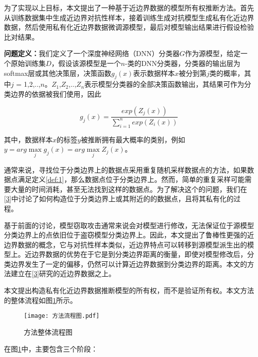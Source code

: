 为了实现以上目标，本文提出了一种基于近边界数据的模型所有权推断方法。首先从训练数据集中生成近边界对抗性样本，接着训练生成对抗模型生成私有化近边界数据，然后使用私有化近边界数据微调源模型，最后对模型输出结果进行假设检验比对结果。

\noindent\textbf{问题定义：}我们定义了一个深度神经网络（DNN）分类器$G$作为源模型，给定一个原始训练集$D$，假设该源模型是一个$n$-类的DNN分类器，分类器的输出层为softmax层或其他决策层，决策函数$g_j(x)$表示数据样本$x$被分到第$j$类的概率，其中$j$ = 1,2,..,$n$。$Z_1$,$Z_2$,..,$Z_n$表示模型分类器的全部决策函数输出，其结果可作为分类边界的依据被我们使用，因此

\begin{equation}
	g_j(x) = \frac{exp(Z_j(x))}{\sum_{i = 1}^n exp(Z_i(x))}
\end{equation}

\noindent 其中，数据样本$x$的标签$y$被推断拥有最大概率的类别，例如$y = arg \mathop{max} \limits_j g_j(x) = arg \mathop{max} \limits_j Z_j(x)$。

通常来说，寻找位于分类边界上的数据点采用重复随机采样数据点的方法，如果数据点满足定义\ref{def:1}，那么数据点位于分类边界上。然而，简单的重复采样可能需要大量的时间消耗，甚至无法找到这样的数据点。为了解决这个的问题，我们在\ref{3}中讨论了如何构造位于分类边界上或其附近的的数据点，且将其私有化的过程。

基于前面的讨论，模型窃取攻击通常来说会对模型进行修改，无法保证位于源模型分类边界上的点依旧位于盗窃模型分类边界上。因此，本文提出了鲁棒性更强的近边界数据的概念，它与对抗性样本类似，近边界特点可以转移到源模型派生出的模型上。近边界数据的优势在于它是到分类边界距离的衡量，即使对模型修改后，分类边界发生了一定的偏移，仍然可以计算近边界数据到分类边界的距离。本文的方法建立在\ref{3}研究的近边界数据之上。

本文提出构造私有化近边界数据推断模型的所有权，而不是验证所有权。本文方法的整体流程如图\ref{方法流程图}所示。

\begin{figure}[htbp]%
	\centering
	\setlength{\abovecaptionskip}{5mm} %
	\vspace{-1mm}
	\setlength{\belowcaptionskip}{-3mm} %
	\texttt{[image: 方法流程图.pdf]}
	\caption{方法整体流程图}
	\label{方法流程图}
	\end {figure}
		
在图\ref{方法流程图}中，主要包含三个阶段：

